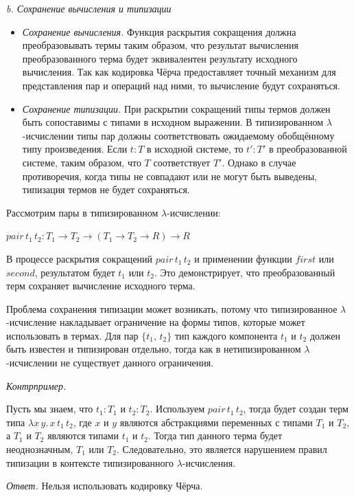 \documentclass[landscape, 11pt]{report}
\begin{document}
	\textit{b. Сохранение вычисления и типизации}

	\begin{itemize}
		\item[] \textit{Сохранение вычисления.} Функция раскрытия сокращения должна преобразовывать термы таким образом, что результат вычисления преобразованного терма будет эквивалентен результату исходного вычисления. Так как кодировка Чёрча предоставляет точный механизм для представления пар и операций над ними, то вычисление будут сохраняться.
		\item[] \textit{Сохранение типизации.} При раскрытии сокращений типы термов должен быть сопоставимы с типами в исходном выражении. В типизированном $\lambda$-исчислении типы пар должны соответствовать ожидаемому обобщённому типу произведения. Если ${t : T}$ в исходной системе, то ${t' : T'}$ в преобразованной системе, таким образом, что $T$ соответствует $T'$. Однако в случае противоречия, когда типы не совпадают или не могут быть выведены, типизация термов не будет сохраняться.
	\end{itemize}

	\newpage
	
	Рассмотрим пары в типизированном $\lambda$-исчислении:
	
	\begin{center}
		$pair \, t_1 \, t_2 : T_1 \rightarrow T_2 \rightarrow (T_1 \rightarrow T_2 \rightarrow R) \rightarrow R$
	\end{center}

	В процессе раскрытия сокращений $pair \, t_1 \, t_2$ и применении функции $first$ или $second$, результатом будет $t_1$ или $t_2$. Это демонстрирует, что преобразованный терм сохраняет вычисление исходного терма.
	
	\vspace{0.2cm}
	
	Проблема сохранения типизации может возникать, потому что типизированное $\lambda$-исчисление накладывает ограничение на формы типов, которые может использовать в термах. Для пар $\{t_1, \, t_2\}$ тип каждого компонента $t_1$ и $t_2$ должен быть известен и типизирован отдельно, тогда как в нетипизированном $\lambda$-исчислении не существует данного ограничения.

	\vspace{0.5cm}
	
	\textit{Контрпример.}
	
	Пусть мы знаем, что $t_1 : T_1$ и $t_2 : T_2$. Используем $pair \, t_1 \, t_2$, тогда будет создан терм типа $\lambda x \, y . \, x \, t_1 \, t_2$, где $x$ и $y$ являются абстракциями переменных с типами $T_1$ и $T_2$, а $T_1$ и $T_2$ являются типами $t_1$ и $t_2$. Тогда тип данного терма будет неоднозначным, $T_1$ или $T_2$. Следовательно, это является нарушением правил типизации в контексте типизированного $\lambda$-исчисления.
	
	\vspace{0.5cm}
	
	\textit{Ответ.} Нельзя использовать кодировку Чёрча.
\end{document}
